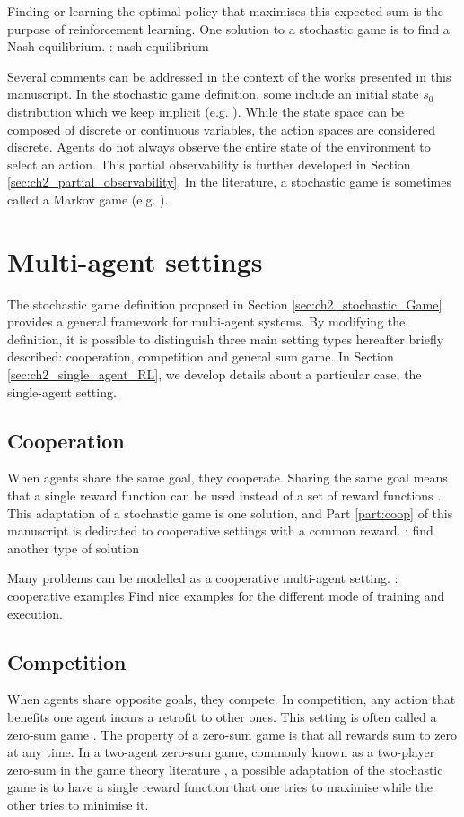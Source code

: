 Finding or learning the optimal policy that maximises this expected sum is the purpose of reinforcement learning.
One solution to a stochastic game is to find a Nash equilibrium.
\todo: nash equilibrium

Several comments can be addressed in the context of the works presented in this manuscript.
In the stochastic game definition, some include an initial state $s_0$ distribution which we keep implicit (e.g. \citep{marl-book}).
While the state space can be composed of discrete or continuous variables, the action spaces are considered discrete.
Agents do not always observe the entire state of the environment to select an action.
This partial observability is further developed in Section \ref{sec:ch2_partial_observability}.
In the literature, a stochastic game is sometimes called a Markov game (e.g. \citep{MarkovGames}).

\section{Multi-agent settings} 
\label{sec:ch2_multi_agent_settings}
The stochastic game definition proposed in Section \ref{sec:ch2_stochastic_Game} provides a general framework for multi-agent systems.
By modifying the definition, it is possible to distinguish three main setting types hereafter briefly described: cooperation, competition and general sum game.
In Section \ref{sec:ch2_single_agent_RL}, we develop details about a particular case, the single-agent setting.

\subsection{Cooperation} 
\label{sec:ch2_Cooperation}
When agents share the same goal, they cooperate.
Sharing the same goal means that a single reward function can be used instead of a set of reward functions \citep{}.
This adaptation of a stochastic game is one solution, and Part \ref{part:coop} of this manuscript is dedicated to cooperative settings with a common reward.
\todo: find another type of solution

Many problems can be modelled as a cooperative multi-agent setting.
\todo: cooperative examples
Find nice examples for the different mode of training and execution.

\subsection{Competition} 
\label{sec:ch2_Competition}
When agents share opposite goals, they compete.
In competition, any action that benefits one agent incurs a retrofit to other ones.
This setting is often called a zero-sum game \citep{}.
The property of a zero-sum game is that all rewards sum to zero at any time.
In a two-agent zero-sum game, commonly known as a two-player zero-sum in the game theory literature \citep{}, a possible adaptation of the stochastic game is to have a single reward function that one tries to maximise while the other tries to minimise it.

